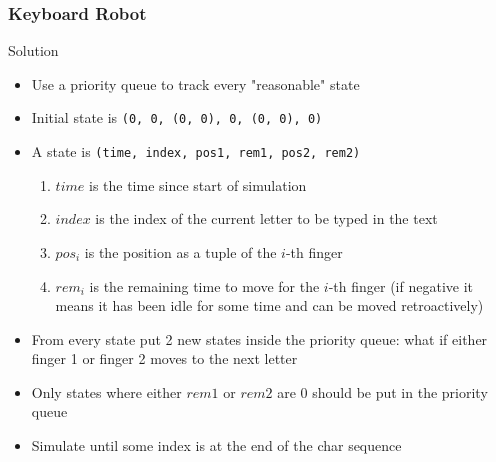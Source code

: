 \documentclass{beamer}
\begin{document}
\begin{frame}
    \frametitle{Keyboard Robot}
    \begin{block}{Solution}
        \begin{itemize}
            \item Use a priority queue to track every "reasonable" state
            \item Initial state is {\tt (0, 0, (0, 0), 0, (0, 0), 0)}
            \item A state is {\tt(time, index, pos1, rem1, pos2, rem2)}
            \begin{enumerate}
                \item $time$ is the time since start of simulation
                \item $index$ is the index of the current letter to be typed in the text
                \item $pos_{i}$ is the position as a tuple of the $i$-th finger
                \item $rem_{i}$ is the remaining time to move for the $i$-th finger (if negative it means it has been idle for some time and can be moved retroactively)

            \end{enumerate}
            \item From every state put 2 new states inside the priority queue: what if either finger 1 or finger 2 moves to the next letter
            \item Only states where either $rem1$ or $rem2$ are 0 should be put in the priority queue
            \item Simulate until some index is at the end of the char sequence
        \end{itemize}
    \end{block}
\end{frame}
\end{document}
